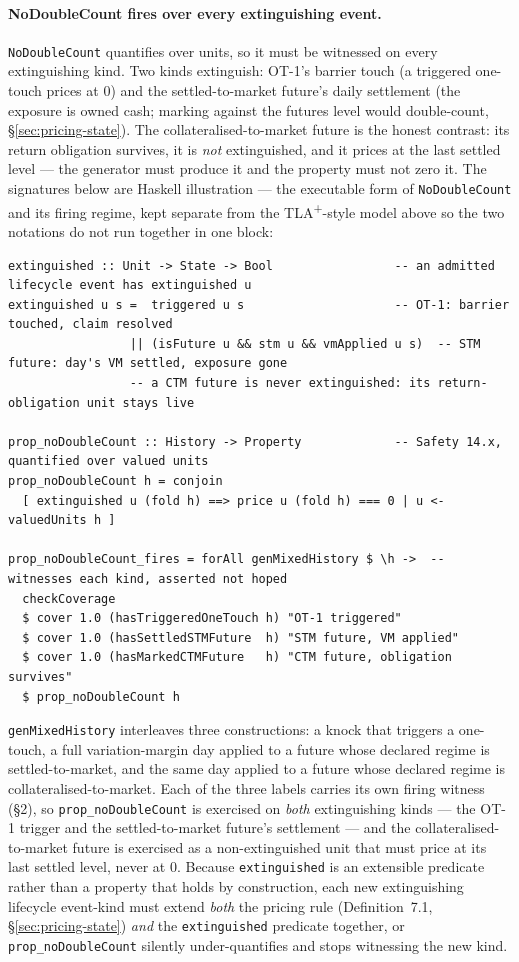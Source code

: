 \documentclass[11pt,a4paper]{article}
\begin{document}
\paragraph{NoDoubleCount fires over every extinguishing event.}
\texttt{NoDoubleCount} quantifies over units, so it must be witnessed on every extinguishing
kind. Two kinds extinguish: OT-1's barrier touch (a triggered one-touch prices at $0$) and
the settled-to-market future's daily settlement (the exposure is owned cash; marking against
the futures level would double-count, \S\ref{sec:pricing-state}). The
collateralised-to-market future is the honest contrast: its return obligation survives, it
is \emph{not} extinguished, and it prices at the last settled level --- the generator must
produce it and the property must not zero it. The
signatures below are Haskell illustration --- the executable form of \texttt{NoDoubleCount} and
its firing regime, kept separate from the TLA\textsuperscript{+}-style model above so the two
notations do not run together in one block:

\begin{lstlisting}
extinguished :: Unit -> State -> Bool                 -- an admitted lifecycle event has extinguished u
extinguished u s =  triggered u s                     -- OT-1: barrier touched, claim resolved
                 || (isFuture u && stm u && vmApplied u s)  -- STM future: day's VM settled, exposure gone
                 -- a CTM future is never extinguished: its return-obligation unit stays live

prop_noDoubleCount :: History -> Property             -- Safety 14.x, quantified over valued units
prop_noDoubleCount h = conjoin
  [ extinguished u (fold h) ==> price u (fold h) === 0 | u <- valuedUnits h ]

prop_noDoubleCount_fires = forAll genMixedHistory $ \h ->  -- witnesses each kind, asserted not hoped
  checkCoverage
  $ cover 1.0 (hasTriggeredOneTouch h) "OT-1 triggered"
  $ cover 1.0 (hasSettledSTMFuture  h) "STM future, VM applied"
  $ cover 1.0 (hasMarkedCTMFuture   h) "CTM future, obligation survives"
  $ prop_noDoubleCount h
\end{lstlisting}

\texttt{genMixedHistory} interleaves three constructions: a knock that triggers a one-touch, a
full variation-margin day applied to a future whose declared regime is settled-to-market, and
the same day applied to a future whose declared regime is collateralised-to-market. Each of the
three labels carries its own firing witness (\S 2), so
\texttt{prop\_noDoubleCount} is exercised on \emph{both} extinguishing kinds --- the OT-1 trigger
and the settled-to-market future's settlement --- and the collateralised-to-market future is
exercised as a non-extinguished unit that must price at its last settled level, never at $0$.
Because \texttt{extinguished} is an
extensible predicate rather than a property that holds by construction, each new extinguishing
lifecycle event-kind must extend \emph{both} the pricing rule (Definition~7.1,
\S\ref{sec:pricing-state}) \emph{and} the \texttt{extinguished} predicate together, or
\texttt{prop\_noDoubleCount} silently under-quantifies and stops witnessing the new kind.
\end{document}
